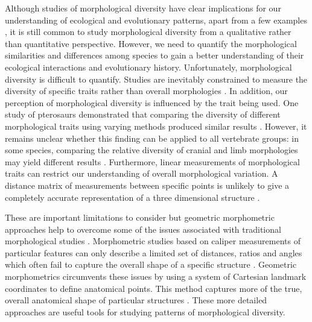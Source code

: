 \documentclass[12pt,a4paper]{article}
\begin{document}
	Although studies of morphological diversity have clear implications for our understanding of ecological and evolutionary patterns, apart from a few examples \citep[e.g.][]{Ruta2013, Goswami2011, Brusatte2008}, it is still common to study morphological diversity from a qualitative rather than quantitative perspective. However, we need to quantify the morphological similarities and differences among species to gain a better understanding of their ecological interactions and evolutionary history. Unfortunately, morphological diversity is difficult to quantify. Studies are inevitably constrained to measure the diversity of specific traits rather than overall morphologies \citep{Roy1997}. In addition, our perception of morphological diversity is influenced by the trait being used. One study of pterosaurs demonstrated that comparing the diversity of different morphological traits using varying methods produced similar results \citep{Foth2012}. However, it remains unclear whether this finding can be applied to all vertebrate groups: in some species, comparing the relative diversity of cranial and limb morphologies may yield different results \citep{Foth2012}. Furthermore, linear measurements of morphological traits can restrict our understanding of overall morphological variation. A distance matrix of measurements between specific points is unlikely to give a completely accurate representation of a three dimensional structure \citep{Rohlf1993}.
	
	These are important limitations to consider but geometric morphometric approaches help to overcome some of the issues associated with traditional morphological studies \citep{Adams2004}. Morphometric studies based on caliper measurements of particular features can only describe a limited set of distances, ratios and angles which often fail to capture the overall shape of a specific structure \citep{Slice2007}. Geometric morphometrics circumvents these issues by using a system of Cartesian landmark coordinates to define anatomical points. This method captures more of the true, overall anatomical shape of particular structures \citep{Mitteroecker2009}. These more detailed approaches are useful tools for studying patterns of morphological diversity.
	
\end{document}
